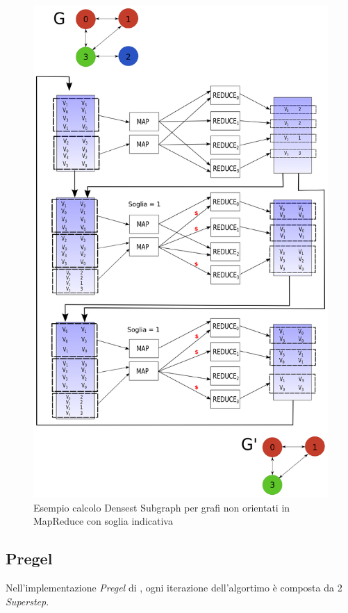 \documentclass[LaM,binding=0.6cm]{sapthesis}
\begin{document}
\begin{figure}
\centering
 \includegraphics[width=1\textwidth]{MR-denesestU}
\caption{Esempio calcolo Densest Subgraph per grafi non orientati in MapReduce con soglia indicativa}
\label{fig:MRDENSESETU}
\end{figure}




\subsection{Pregel}

Nell'implementazione \textit{Pregel} di \cite{Bahmani:2012:DSS:2140436.2140442}, ogni iterazione dell'algortimo è composta da 2 \textit{Superstep}.
\end{document}
